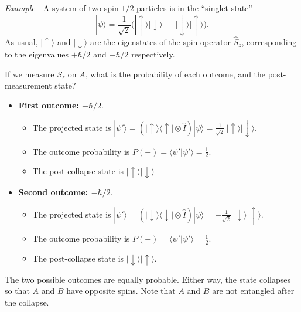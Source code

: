 \documentclass[prx,12pt]{revtex4-2}
\begin{document}
\begin{framed}
\noindent
\textit{Example}---A system of two spin-$1/2$ particles is in
the ``singlet state''
\begin{equation}
  |\psi\rangle = \frac{1}{\sqrt{2}} \Big(|\!\uparrow\rangle|\!\downarrow\rangle \,-\, |\!\downarrow\rangle|\!\uparrow\rangle\Big).
\end{equation}
As usual, $|\!\uparrow\rangle$ and $|\!\downarrow\rangle$ are the
eigenstates of the spin operator $\hat{S}_z$, corresponding to the
eigenvalues $+\hbar/2$ and $-\hbar/2$ respectively.

If we measure $S_z$ on $A$, what is the probability of each outcome,
and the post-measurement state?

\begin{itemize}
  \label{box:eproutcomes}
\item \textbf{First outcome: $+\hbar/2$}.
  \begin{itemize}
  \item The projected state is $\displaystyle |\psi'\rangle = \left(|\!\uparrow\rangle\langle\uparrow| \otimes \hat{I}\right)|\psi\rangle = 
    \frac{1}{\sqrt{2}}\,|\!\uparrow\rangle|\!\downarrow\rangle$.
  \item The outcome probability is $\displaystyle
    P(+) = \langle \psi'|\psi'\rangle = \frac{1}{2}$.
  \item The post-collapse state is $\displaystyle |\!\uparrow\rangle |\!\downarrow\rangle$
  \end{itemize}

\item \textbf{Second outcome: $-\hbar/2$}.
  \begin{itemize}
  \item The projected state is $\displaystyle |\psi'\rangle = \left(|\!\downarrow\rangle\langle\downarrow| \otimes \hat{I}\right)|\psi\rangle = 
    -\frac{1}{\sqrt{2}}\,|\!\downarrow\rangle|\!\uparrow\rangle$.
  \item The outcome probability is $\displaystyle P(-) = \langle \psi'|\psi'\rangle =
    \frac{1}{2}$.
  \item The post-collapse state is $\displaystyle |\!\downarrow\rangle |\!\uparrow\rangle$.
  \end{itemize}
\end{itemize}
The two possible outcomes are equally probable.  Either way, the state
collapses so that $A$ and $B$ have opposite spins.  Note that $A$ and
$B$ are not entangled after the collapse.
\end{framed}
\end{document}
